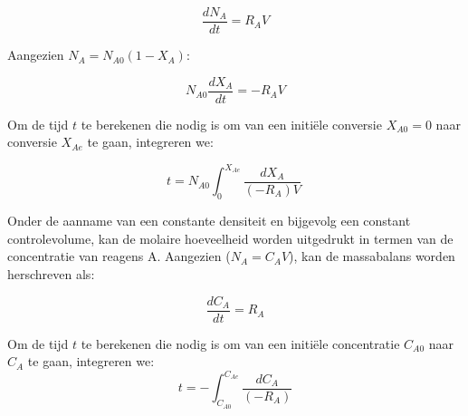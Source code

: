 \documentclass{ximera}
\begin{document}
\[
\frac{dN_A}{dt} = R_A V
\]

Aangezien $N_A = N_{A0}(1-X_A)$:

\[
N_{A0} \frac{dX_A}{dt} = -R_A V
\]

Om de tijd \(t\) te berekenen die nodig is om van een initiële conversie \(X_{A0} = 0\) naar conversie \(X_{Ae}\) te gaan, integreren we:

\[
\boxed{
t = N_{A0} \int_0^{X_{Ae}} \frac{dX_A}{(-R_A)V}\
}
\]

\begin{image}
\end{image} 

Onder de aanname van een constante densiteit en bijgevolg een constant controlevolume, kan de molaire hoeveelheid worden uitgedrukt in termen van de concentratie van reagens A. Aangezien ($N_A = C_A V$), kan de massabalans worden herschreven als:

\[\frac{dC_A}{dt} = R_A\]

Om de tijd \(t\) te berekenen die nodig is om van een initiële concentratie \(C_{A0}\) naar \(C_A\) te gaan, integreren we:
\[
\boxed{
t = -\int_{C_{A0}}^{C_{Ae}} \frac{dC_A}{(-R_A)}
}
\]
\end{document}
